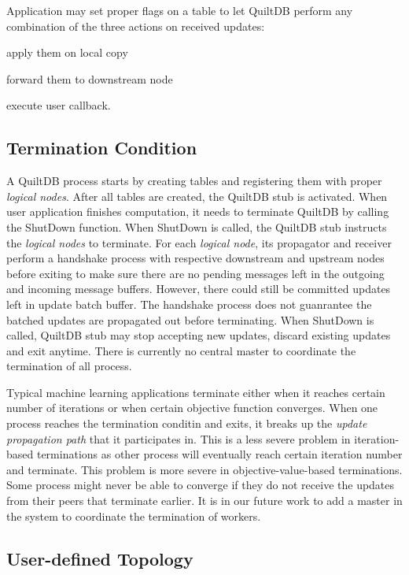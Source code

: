 \documentclass[11pt, twocolumn]{article}
\begin{document}
Application may set proper flags on a table to let QuiltDB perform any
combination of the three actions on received updates:
\begin{enumerate*}
\item apply them on local copy
\item forward them to downstream node
\item execute user callback.
\end{enumerate*}

\subsection{Termination Condition}

A QuiltDB process starts by creating tables and registering them with proper 
\emph{logical nodes}. After all tables are created, the QuiltDB stub is 
activated. When user application finishes computation, it needs to 
terminate QuiltDB by calling the ShutDown function. When ShutDown is called, the
QuiltDB stub instructs the \emph{logical nodes} to terminate. For each 
\emph{logical node}, its propagator and receiver perform a handshake process 
with respective downstream and upstream nodes before exiting to make sure 
there are no pending messages left in the outgoing and incoming message buffers.
However, there could still be committed updates left in update batch buffer. The
 handshake process does not guanrantee the batched updates are propagated out 
before terminating. When ShutDown is called, QuiltDB stub may stop accepting new
updates, discard existing updates and exit anytime. There is currently no 
central master to coordinate the termination of all process.

Typical machine learning applications terminate either when it reaches certain 
number of iterations or when certain objective function converges. When one
process reaches the termination conditin and exits, it breaks up the \emph{update
propagation path} that it participates in. This is a less severe problem in 
iteration-based terminations
as other process will eventually reach certain iteration number and terminate. 
This problem is more severe in objective-value-based terminations. Some 
process might never be able to converge if they do not receive the updates from 
their peers that terminate earlier. It is in our future work to add a master in 
the system to coordinate the termination of workers.

\subsection{User-defined Topology}
\end{document}
